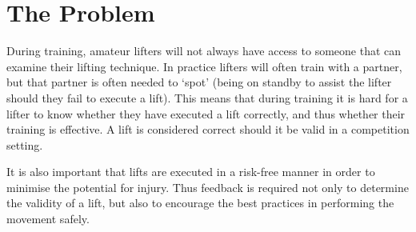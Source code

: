 \pagebreak
\section{The Problem}

During training, amateur lifters will not always have access to someone that can examine their lifting technique. In practice lifters will often train with a partner, but that partner is often needed to `spot' (being on standby to assist the lifter should they fail to execute a lift). This means that during training it is hard for a lifter to know whether they have executed a lift correctly, and thus whether their training is effective. A lift is considered correct should it be valid in a competition setting.

It is also important that lifts are executed in a risk-free manner in order to minimise the potential for injury. Thus feedback is required not only to determine the validity of a lift, but also to encourage the best practices in performing the movement safely.